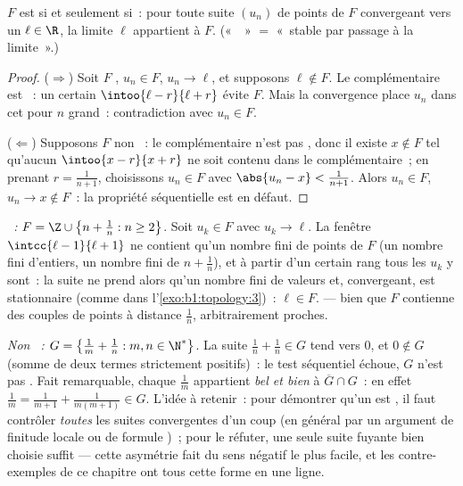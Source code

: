 \begin{theorem}\label{thm:b1:topology:seqclosed}
$F$ est  si et seulement si~: pour toute suite $(u_n)$ de points
de $F$ convergeant vers un $\ell \in \R$, la limite $\ell$ appartient à
$F$. («~~» $=$ «~stable par passage à la limite~».)
\end{theorem}

\begin{proof}
($\Rightarrow$) Soit $F$ , $u_n \in F$, $u_n \to \ell$, et
supposons $\ell \notin F$. Le complémentaire est ~: un certain
$\intoo{\ell - r}{\ell + r}$ évite $F$. Mais la convergence place $u_n$
dans cet  pour $n$ grand~: contradiction avec $u_n \in F$.

($\Leftarrow$) Supposons $F$ non ~: le complémentaire n'est pas
, donc il existe $x \notin F$ tel qu'aucun 
$\intoo{x - r}{x + r}$ ne soit contenu dans le complémentaire~; en
prenant $r = \frac{1}{n+1}$, choisissons $u_n \in F$ avec
$\abs{u_n - x} < \frac{1}{n+1}$. Alors $u_n \in F$, $u_n \to x \notin
F$~: la propriété séquentielle est en défaut.
\end{proof}

\begin{example}\label{ex:b1:topology:seqtest}
\emph{~:} $F = \Z \cup \bigl\{n + \frac1n : n \geq 2\bigr\}$.
Soit $u_k \in F$ avec $u_k \to \ell$. La fenêtre $\intcc{\ell -
1}{\ell + 1}$ ne contient qu'un nombre fini de points de $F$ (un
nombre fini d'entiers, un nombre fini de $n + \frac1n$), et à
partir d'un certain rang tous les $u_k$ y sont~: la suite ne prend
alors qu'un nombre fini de valeurs et, convergeant, est
stationnaire (comme dans l'\cref{exo:b1:topology:3})~: $\ell \in F$.
 --- bien que $F$ contienne des couples de points à distance
$\frac1n$, arbitrairement proches.

\emph{Non ~:} $G = \bigl\{\frac1m + \frac1n : m, n \in
\N^*\bigr\}$. La suite $\frac1n + \frac1n \in G$ tend vers $0$, et
$0 \notin G$ (somme de deux termes strictement positifs)~: le test
séquentiel échoue, $G$ n'est pas . Fait remarquable, chaque
$\frac1m$ appartient \emph{bel et bien} à $\overline G \cap G$~: en
effet $\frac1m = \frac{1}{m+1} + \frac{1}{m(m+1)} \in G$. L'idée à
retenir~: pour démontrer qu'un  est , il faut
contrôler \emph{toutes} les suites convergentes d'un coup (en
général par un argument de finitude locale ou de formule )~;
pour le réfuter, une seule suite fuyante bien choisie suffit ---
cette asymétrie fait du sens négatif le plus facile, et les
contre-exemples de ce chapitre ont tous cette forme en une ligne.
\end{example}

